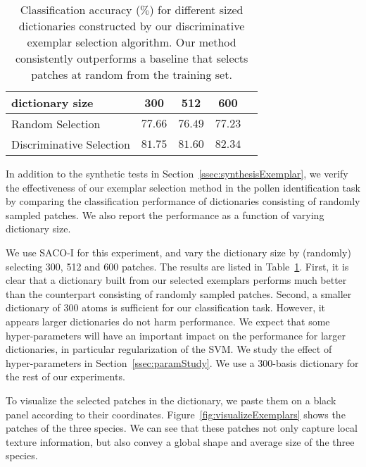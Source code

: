 \documentclass[10pt,twocolumn,letterpaper]{article}
\begin{document}
\begin{table}[t]
\small
\centering
\begin{tabular}{|l|c|c|c|c|}
\hline
dictionary size                        &	300      &		512 & 600          \\
\hline
Random Selection & $77.66$     &$76.49$ & $77.23$       \\
\hline
Discriminative Selection & $81.75$     &$81.60$ & $82.34$       \\
\hline
\end{tabular}
\caption{Classification accuracy ($\%$) for different sized dictionaries
constructed by our discriminative exemplar selection algorithm. Our method
consistently outperforms a baseline that selects patches at random from
the training set.}
\label{tab:acc_vs_dictSize}
\vspace{-3mm}
\end{table}



In addition to the synthetic tests in Section~\ref{ssec:synthesisExemplar}, we
verify the effectiveness of our exemplar selection method in the pollen
identification task by comparing the classification performance of dictionaries
consisting of randomly sampled patches. We also report the performance as a
function of varying dictionary size.

We use SACO-I for this experiment, and vary the dictionary size by (randomly)
selecting 300, 512 and 600 patches.  The results are listed in
Table~\ref{tab:acc_vs_dictSize}.  First, it is clear that a dictionary built
from our selected exemplars performs much better than the counterpart
consisting of randomly sampled patches.  Second, a smaller dictionary of 300
atoms is sufficient for our classification task.  However, it appears larger
dictionaries do not harm performance.  We expect that some hyper-parameters
will have an important impact on the performance for larger dictionaries, in
particular regularization of the SVM.  We study the effect of hyper-parameters
in Section~\ref{ssec:paramStudy}.  We use a 300-basis dictionary for the rest
of our experiments.

To visualize the selected patches in the dictionary, we paste them on a black
panel according to their coordinates.  Figure~\ref{fig:visualizeExemplars}
shows the patches of the three species.  We can see that these patches not only
capture local texture information, but also convey a global shape and average
size of the three species.
\end{document}
